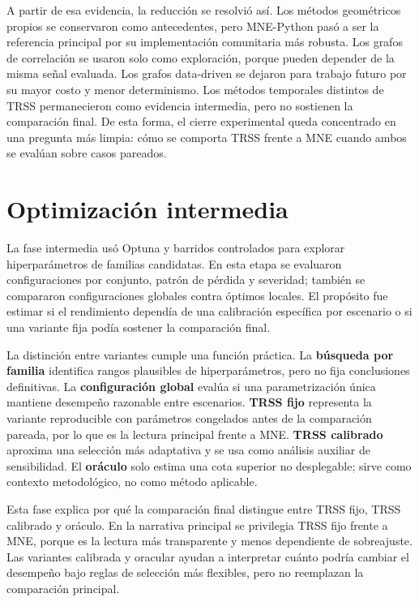 A partir de esa evidencia, la reducción se resolvió así. Los métodos geométricos propios se conservaron como antecedentes, pero MNE-Python pasó a ser la referencia principal por su implementación comunitaria más robusta. Los grafos de correlación se usaron solo como exploración, porque pueden depender de la misma señal evaluada. Los grafos data-driven se dejaron para trabajo futuro por su mayor costo y menor determinismo. Los métodos temporales distintos de TRSS permanecieron como evidencia intermedia, pero no sostienen la comparación final. De esta forma, el cierre experimental queda concentrado en una pregunta más limpia: cómo se comporta TRSS frente a MNE cuando ambos se evalúan sobre casos pareados.

\section{Optimización intermedia}

La fase intermedia usó Optuna y barridos controlados para explorar hiperparámetros de familias candidatas. En esta etapa se evaluaron configuraciones por conjunto, patrón de pérdida y severidad; también se compararon configuraciones globales contra óptimos locales. El propósito fue estimar si el rendimiento dependía de una calibración específica por escenario o si una variante fija podía sostener la comparación final.

La distinción entre variantes cumple una función práctica. La \textbf{búsqueda por familia} identifica rangos plausibles de hiperparámetros, pero no fija conclusiones definitivas. La \textbf{configuración global} evalúa si una parametrización única mantiene desempeño razonable entre escenarios. \textbf{TRSS fijo} representa la variante reproducible con parámetros congelados antes de la comparación pareada, por lo que es la lectura principal frente a MNE. \textbf{TRSS calibrado} aproxima una selección más adaptativa y se usa como análisis auxiliar de sensibilidad. El \textbf{oráculo} solo estima una cota superior no desplegable; sirve como contexto metodológico, no como método aplicable.

Esta fase explica por qué la comparación final distingue entre TRSS fijo, TRSS calibrado y oráculo. En la narrativa principal se privilegia TRSS fijo frente a MNE, porque es la lectura más transparente y menos dependiente de sobreajuste. Las variantes calibrada y oracular ayudan a interpretar cuánto podría cambiar el desempeño bajo reglas de selección más flexibles, pero no reemplazan la comparación principal.

